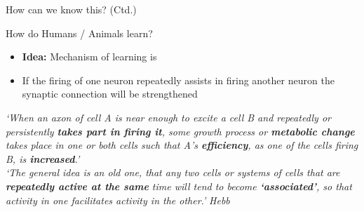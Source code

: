 \begin{frame}{How can we know this? (Ctd.)}{}
\end{frame}


\begin{frame}{How do Humans / Animals learn?}{}
	\footnotesize
	\vspace*{-2mm}
	\begin{itemize}
		\item \textbf{Idea:} Mechanism of learning is 
		\item {} If the firing of one neuron repeatedly assists in firing another neuron
			the synaptic connection will be strengthened
	\end{itemize}
	
	\begin{boxBlueNoFrame}
		\textit{`When an axon of cell A is near enough to excite a cell B and repeatedly or persistently \textbf{takes part in
			firing it}, some growth process or \textbf{metabolic change} takes place in one or both cells such that
			A's \textbf{efficiency}, as one of the cells firing B, is \textbf{increased}.'} \\[-3mm]

		\textit{`The general idea is an old one, that any two cells or systems of cells that are
			\textbf{repeatedly active at the same} time will tend to become \textbf{`associated'}, so that activity
			in one facilitates activity in the other.'} \hfill \textit{Hebb}
	\end{boxBlueNoFrame}
\end{frame}


